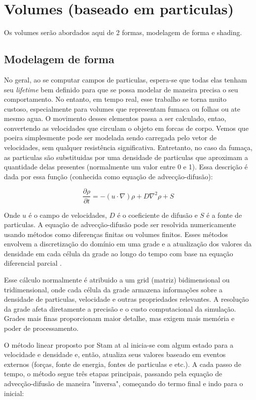 \section{Volumes (baseado em particulas)}
\label{sec:volumes}

Os volumes serão abordados aqui de 2 formas, modelagem de forma e shading.

\subsection{Modelagem de forma}
No geral, ao se computar campos de particulas, espera-se que todas elas tenham seu \textit{lifetime} bem definido para que se possa modelar de maneira precisa o seu comportamento. No entanto, em tempo real, esse trabalho se torna muito custoso, especialmente para volumes que representam fumaca ou folhas ou ate mesmo agua. O movimento desses elementos passa a ser calculado, entao, convertendo as velocidades que circulam o objeto em forcas de corpo. Vemos que poeira simplesmente pode ser modelada sendo carregada pelo vetor de velocidades, sem qualquer resistência significativa. Entretanto, no caso da fumaça, as particulas são substituidas por uma densidade de particulas que aproximam a quantidade delas presentes (normalmente um valor entre 0 e 1). Essa descrição é dada por essa função (conhecida como equação de advecção-difusão): 

$$
\frac{\partial \rho}{\partial t} = - (u \cdot \nabla) \rho + D \nabla^2 \rho + S
$$

Onde $u$ é o campo de velocidades, $D$ é o coeficiente de difusão e $S$ é a fonte de particulas. A equação de advecção-difusão pode ser resolvida numericamente usando métodos como diferenças finitas ou volumes finitos. Esses métodos envolvem a discretização do domínio em uma grade e a atualização dos valores da densidade em cada célula da grade ao longo do tempo com base na equação diferencial parcial \cite{Stam2003}.

Esse cálculo normalmente é atribuido a um grid (matriz) bidimensional ou tridimensional, onde cada célula da grade armazena informações sobre a densidade de particulas, velocidade e outras propriedades relevantes. A resolução da grade afeta diretamente a precisão e o custo computacional da simulação. Grades mais finas proporcionam maior detalhe, mas exigem mais memória e poder de processamento.

O método linear proposto por Stam at al \cite{Stam2003} inicia-se com algum estado para a velocidade e densidade e, então, atualiza seus valores baseado em eventos externos (forças, fonte de energia, fontes de particulas e etc.). A cada passo de tempo, o método segue três etapas principais, passando pela equação de advecção-difusão de maneira "inversa", começando do termo final e indo para o inicial:

